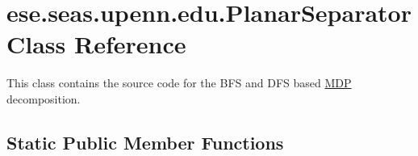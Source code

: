 \hypertarget{classese_1_1seas_1_1upenn_1_1edu_1_1_planar_separator}{}\section{ese.\+seas.\+upenn.\+edu.\+Planar\+Separator Class Reference}
\label{classese_1_1seas_1_1upenn_1_1edu_1_1_planar_separator}


This class contains the source code for the B\+F\+S and D\+F\+S based \hyperlink{classese_1_1seas_1_1upenn_1_1edu_1_1_m_d_p}{M\+D\+P} decomposition.  


\subsection*{Static Public Member Functions}
